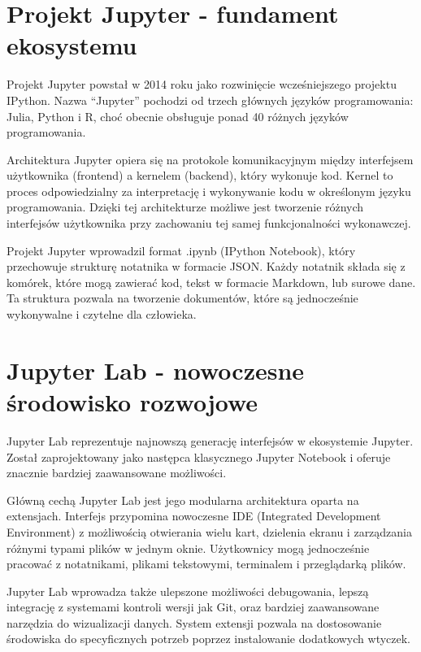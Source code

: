 \documentclass[
  polish,
  letterpaper,
  DIV=11,
  numbers=noendperiod]{scrreprt}
\begin{document}
\section{Projekt Jupyter - fundament
ekosystemu}\label{projekt-jupyter---fundament-ekosystemu}

Projekt Jupyter powstał w 2014 roku jako rozwinięcie wcześniejszego
projektu IPython. Nazwa ``Jupyter'' pochodzi od trzech głównych języków
programowania: Julia, Python i R, choć obecnie obsługuje ponad 40
różnych języków programowania.

Architektura Jupyter opiera się na protokole komunikacyjnym między
interfejsem użytkownika (frontend) a kernelem (backend), który wykonuje
kod. Kernel to proces odpowiedzialny za interpretację i wykonywanie kodu
w określonym języku programowania. Dzięki tej architekturze możliwe jest
tworzenie różnych interfejsów użytkownika przy zachowaniu tej samej
funkcjonalności wykonawczej.

Projekt Jupyter wprowadzil format .ipynb (IPython Notebook), który
przechowuje strukturę notatnika w formacie JSON. Każdy notatnik składa
się z komórek, które mogą zawierać kod, tekst w formacie Markdown, lub
surowe dane. Ta struktura pozwala na tworzenie dokumentów, które są
jednocześnie wykonywalne i czytelne dla człowieka.

\section{Jupyter Lab - nowoczesne środowisko
rozwojowe}\label{jupyter-lab---nowoczesne-ux15brodowisko-rozwojowe}

Jupyter Lab reprezentuje najnowszą generację interfejsów w ekosystemie
Jupyter. Został zaprojektowany jako następca klasycznego Jupyter
Notebook i oferuje znacznie bardziej zaawansowane możliwości.

Główną cechą Jupyter Lab jest jego modularna architektura oparta na
extensjach. Interfejs przypomina nowoczesne IDE (Integrated Development
Environment) z możliwością otwierania wielu kart, dzielenia ekranu i
zarządzania różnymi typami plików w jednym oknie. Użytkownicy mogą
jednocześnie pracować z notatnikami, plikami tekstowymi, terminalem i
przeglądarką plików.

Jupyter Lab wprowadza także ulepszone możliwości debugowania, lepszą
integrację z systemami kontroli wersji jak Git, oraz bardziej
zaawansowane narzędzia do wizualizacji danych. System extensji pozwala
na dostosowanie środowiska do specyficznych potrzeb poprzez instalowanie
dodatkowych wtyczek.
\end{document}
